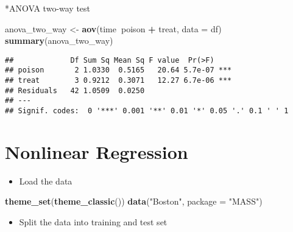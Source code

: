 \documentclass[]{article}
\newenvironment{Shaded}{\begin{snugshade}}{\end{snugshade}}
\newcommand{\DataTypeTok}[1]{\textcolor[rgb]{0.13,0.29,0.53}{#1}}
\newcommand{\DecValTok}[1]{\textcolor[rgb]{0.00,0.00,0.81}{#1}}
\newcommand{\FloatTok}[1]{\textcolor[rgb]{0.00,0.00,0.81}{#1}}
\newcommand{\KeywordTok}[1]{\textcolor[rgb]{0.13,0.29,0.53}{\textbf{#1}}}
\newcommand{\NormalTok}[1]{#1}
\newcommand{\OperatorTok}[1]{\textcolor[rgb]{0.81,0.36,0.00}{\textbf{#1}}}
\newcommand{\OtherTok}[1]{\textcolor[rgb]{0.56,0.35,0.01}{#1}}
\newcommand{\StringTok}[1]{\textcolor[rgb]{0.31,0.60,0.02}{#1}}
\providecommand{\tightlist}{%
  \setlength{\itemsep}{0pt}\setlength{\parskip}{0pt}}
\begin{document}
*ANOVA two-way test

\begin{Shaded}
\begin{Highlighting}[]
\NormalTok{anova_two_way <-}\StringTok{ }\KeywordTok{aov}\NormalTok{(time}\OperatorTok{~}\NormalTok{poison }\OperatorTok{+}\StringTok{ }\NormalTok{treat, }\DataTypeTok{data =}\NormalTok{ df)}
\KeywordTok{summary}\NormalTok{(anova_two_way)}
\end{Highlighting}
\end{Shaded}

\begin{verbatim}
##             Df Sum Sq Mean Sq F value  Pr(>F)    
## poison       2 1.0330  0.5165   20.64 5.7e-07 ***
## treat        3 0.9212  0.3071   12.27 6.7e-06 ***
## Residuals   42 1.0509  0.0250                    
## ---
## Signif. codes:  0 '***' 0.001 '**' 0.01 '*' 0.05 '.' 0.1 ' ' 1
\end{verbatim}

\hypertarget{nonlinear-regression}{%
\section{Nonlinear Regression}\label{nonlinear-regression}}

\begin{itemize}
\tightlist
\item
  Load the data
\end{itemize}

\begin{Shaded}
\begin{Highlighting}[]
\KeywordTok{theme_set}\NormalTok{(}\KeywordTok{theme_classic}\NormalTok{())}
\KeywordTok{data}\NormalTok{(}\StringTok{"Boston"}\NormalTok{, }\DataTypeTok{package =} \StringTok{"MASS"}\NormalTok{)}
\end{Highlighting}
\end{Shaded}

\begin{itemize}
\tightlist
\item
  Split the data into training and test set
\end{itemize}

\begin{Shaded}
\end{Shaded}
\end{document}
